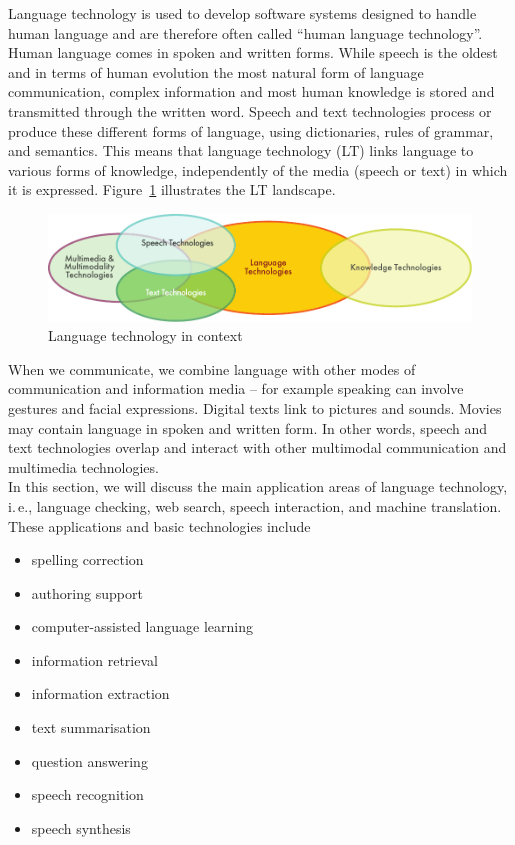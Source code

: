 \begin{multicols}{2}

Language technology is used to develop software systems designed to handle human language and are therefore often called “human language technology”. Human language comes in spoken and written forms. While speech is the oldest and in terms of human evolution the most natural form of language communication, complex information and most human knowledge is stored and transmitted through the written word. Speech and text technologies process or produce these different forms of language, using dictionaries, rules of grammar, and semantics. This means that language technology (LT) links language to various forms of knowledge, independently of the media (speech or text) in which it is expressed. Figure~\ref{fig:ltincontext_en} illustrates the LT landscape.

\begin{figure}[htb]
  \center
  \includegraphics[width=\textwidth]{../_media/english/language_technologies}
  \caption{Language technology in context}
  \label{fig:ltincontext_en}
\end{figure}

When we communicate, we combine language with other modes of communication and information media – for example speaking can involve gestures and facial expressions. Digital texts link to pictures and sounds. Movies may contain language in spoken and written form. In other words, speech and text technologies overlap and interact with other multimodal communication and multimedia technologies.\\
In this section, we will discuss the main application areas of language technology, i.\,e., language checking, web search, speech interaction, and machine translation. These applications and basic technologies include

\begin{itemize}
\item spelling correction
\item authoring support
\item computer-assisted language learning
\item information retrieval
\item information extraction
\item text summarisation
\item question answering
\item speech recognition
\item speech synthesis
\end{itemize}


\end{multicols}
